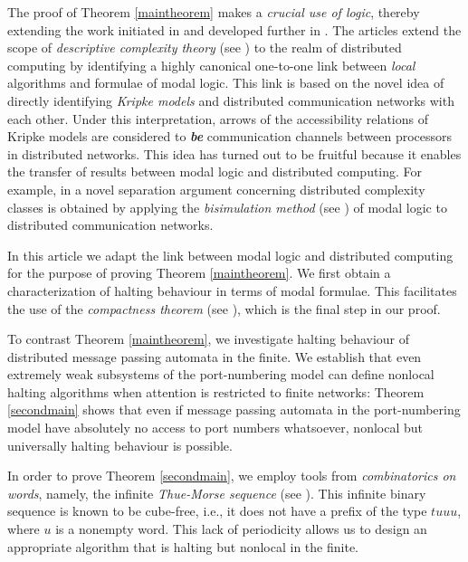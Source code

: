\documentclass[copyright,creativecommons]{eptcs}
\begin{document}
The proof of Theorem \ref{maintheorem} makes a \emph{crucial use of logic},
thereby extending the work initiated in \cite{hella, hella2}
and developed further in \cite{kuusi}.
The articles \cite{hella, hella2, kuusi} extend the scope of \emph{descriptive complexity theory}
(see \cite{ebbinghaus, Immerman, libkin}) to the realm of distributed computing by identifying a
highly canonical one-to-one link between \emph{local} algorithms and
formulae of modal logic.
This link is based on the novel idea of 
directly identifying \emph{Kripke models}
and distributed communication networks with each other.
Under this interpretation, arrows of the accessibility relations of
Kripke models are considered to \emph{\textbf{be}} communication channels
between processors in distributed networks.
This idea has turned out to be fruitful because it enables the
transfer of results between modal logic and distributed computing.
For example, in \cite{hella, hella2} a novel separation argument
concerning distributed complexity classes is obtained by applying the
\emph{bisimulation method} (see \cite{johan, han, blackburn}) of modal logic to
distributed communication networks.




In this article we adapt the link between modal logic
and distributed computing for the purpose of
proving Theorem \ref{maintheorem}\hspace{0.4mm}.
We first obtain a characterization of 
halting behaviour in terms of modal formulae.
This facilitates the use of the \emph{compactness theorem} (see \cite{ebbinghaus}),
which is the final step in our  proof.




To contrast Theorem \ref{maintheorem}\hspace{0.4mm}, we investigate halting
behaviour of distributed message passing automata in the finite.
We establish that even extremely weak subsystems of the port-numbering model
can define nonlocal halting algorithms when attention is restricted to
finite networks:
Theorem \ref{secondmain} shows that even if message passing automata in the port-numbering
model have absolutely no access to port numbers whatsoever,
nonlocal but universally halting behaviour is possible.


In order to prove Theorem \ref{secondmain}\hspace{0.4mm}, we employ tools from
\emph{combinatorics on words}, namely, the 
infinite \emph{Thue-Morse sequence} (see \cite{allouche}). This infinite binary sequence is known to be cube-free,
i.e., it does not have a prefix of the type $tuuu$, where $u$ is a nonempty word. This 
lack of periodicity allows us to design an appropriate algorithm that is halting but nonlocal
in the finite.
\end{document}
